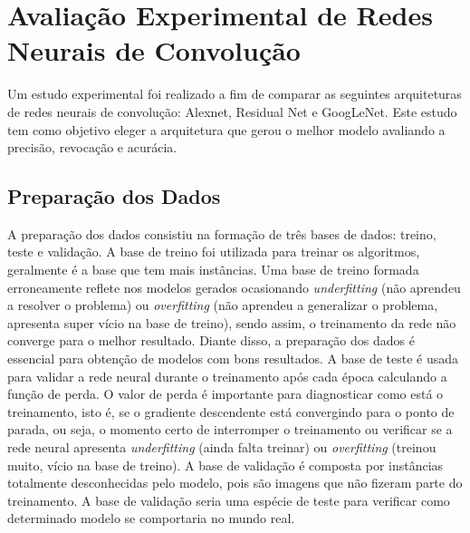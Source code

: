 \section{Avaliação Experimental de Redes Neurais de Convolução}\label{sec:avalexp}

Um estudo experimental foi realizado a fim de comparar as seguintes arquiteturas de redes neurais de convolução: Alexnet, Residual Net e GoogLeNet. Este estudo tem como objetivo eleger a arquitetura que gerou o melhor modelo avaliando a precisão, revocação e acurácia.  



\subsection{Preparação dos Dados}\label{prepdados}
A preparação dos dados consistiu na formação de três bases de dados: treino, teste e validação. A base de treino foi utilizada para treinar os algoritmos, geralmente é a base que tem mais instâncias. Uma base de treino formada erroneamente reflete nos modelos gerados ocasionando \textit{underfitting} (não aprendeu a resolver o problema) ou \textit{overfitting} (não aprendeu a generalizar o problema, apresenta super vício na base de treino), sendo assim, o treinamento da rede não converge para o melhor resultado. Diante disso, a preparação dos dados é essencial para obtenção de modelos com bons resultados. A base de teste é usada para validar a rede neural durante o treinamento após cada época calculando a função de perda. O valor de perda é importante para diagnosticar como está o treinamento, isto é, se o gradiente descendente está convergindo para o ponto de parada, ou seja, o momento certo de interromper o treinamento ou verificar se a rede neural apresenta \textit{underfitting} (ainda falta treinar) ou \textit{overfitting} (treinou muito, vício na base de treino). A base de validação é composta por instâncias totalmente desconhecidas pelo modelo, pois são imagens que não fizeram parte do treinamento. A base de validação seria uma espécie de teste para verificar como determinado modelo se comportaria no mundo real.  

